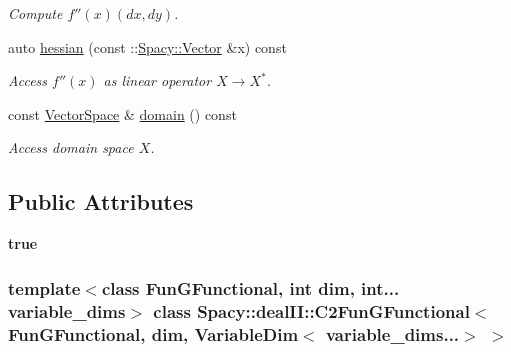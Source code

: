 \begin{DoxyCompactItemize}
\begin{DoxyCompactList}\small\item\em \-Compute $f''(x)(dx,dy)$. \end{DoxyCompactList}\item 
auto \hyperlink{classSpacy_1_1dealII_1_1C2FunGFunctional_3_01FunGFunctional_00_01dim_00_01VariableDim_3_01variable__dims_8_8_8_4_01_4_a60041dd721e5bd7f530428699cacc822}{hessian} (const \-::\hyperlink{classSpacy_1_1Vector}{\-Spacy\-::\-Vector} \&x) const 
\begin{DoxyCompactList}\small\item\em \-Access $f''(x)$ as linear operator $X\rightarrow X^*$. \end{DoxyCompactList}\item 
\hypertarget{classSpacy_1_1FunctionalBase_a2d3397deb9fa1ad85ed04e37a03b3aa6}{const \hyperlink{classSpacy_1_1VectorSpace}{\-Vector\-Space} \& \hyperlink{classSpacy_1_1FunctionalBase_a2d3397deb9fa1ad85ed04e37a03b3aa6}{domain} () const }\label{classSpacy_1_1FunctionalBase_a2d3397deb9fa1ad85ed04e37a03b3aa6}

\begin{DoxyCompactList}\small\item\em \-Access domain space $X$. \end{DoxyCompactList}\end{DoxyCompactItemize}
\subsection*{\-Public \-Attributes}
\begin{DoxyCompactItemize}
\item 
\hypertarget{classSpacy_1_1dealII_1_1C2FunGFunctional_3_01FunGFunctional_00_01dim_00_01VariableDim_3_01variable__dims_8_8_8_4_01_4_a6dada6a40f6597fc047d61f299004b4a}{{\bfseries true}}\label{classSpacy_1_1dealII_1_1C2FunGFunctional_3_01FunGFunctional_00_01dim_00_01VariableDim_3_01variable__dims_8_8_8_4_01_4_a6dada6a40f6597fc047d61f299004b4a}

\end{DoxyCompactItemize}
\subsubsection*{template$<$class Fun\-G\-Functional, int dim, int... variable\-\_\-dims$>$ class Spacy\-::deal\-I\-I\-::\-C2\-Fun\-G\-Functional$<$ Fun\-G\-Functional, dim, Variable\-Dim$<$ variable\-\_\-dims...$>$ $>$}



